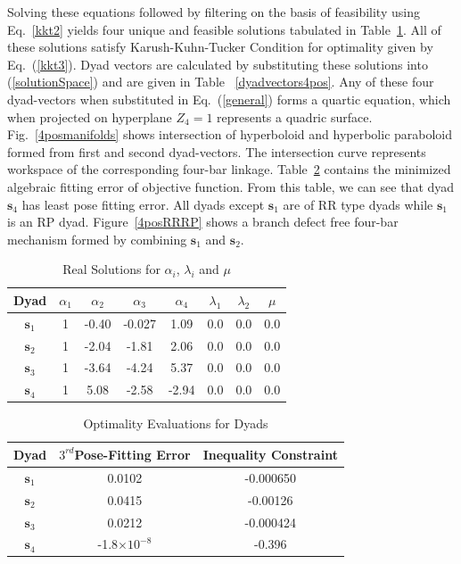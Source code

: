 \documentclass[twocolumn,10pt]{asme2ej}
\newcommand{\req}[1]{(\ref{#1})}
\begin{document}
Solving these equations followed by filtering on the basis of feasibility using Eq.~\ref{kkt2} yields four unique and feasible solutions tabulated in Table~\ref{alphasol}. All of these solutions satisfy Karush-Kuhn-Tucker Condition for optimality given by Eq.~\req{kkt3}. Dyad vectors are calculated by substituting these solutions into \req{solutionSpace} and are given in Table ~\ref{dyadvectors4pos}. Any of these four dyad-vectors when substituted in Eq.~\req{general} forms a quartic equation, which when projected on hyperplane $Z_4 = 1$ represents a quadric surface. Fig.~\ref{4posmanifolds} shows intersection of hyperboloid and hyperbolic paraboloid  formed from first and second dyad-vectors. The intersection curve represents workspace of the corresponding four-bar linkage. Table~\ref{error4pos} contains the minimized algebraic fitting error of objective function. From this table, we can see that dyad $\textbf{s}_4$ has least pose fitting error. All dyads except $\textbf{s}_1$ are of RR type dyads while $\textbf{s}_1$ is an RP dyad. Figure~\ref{4posRRRP} shows a branch defect free four-bar mechanism formed by combining $\textbf{s}_1$ and $\textbf{s}_2$.

\begin{table}
\caption{Real Solutions for $\alpha_i$, $\lambda_i$ and $\mu$}
\centering
\label{alphasol}
\begin{tabular}{cccccccc}
\hline
Dyad &$\alpha_1$&$\alpha_2$ & $\alpha_3$& $\alpha_4$& $\lambda_1$& $\lambda_2$& $\mu$\\
\hline
$\textbf{s}_1$  & 1 & -0.40 & -0.027 & 1.09 & 0.0 & 0.0 & 0.0 \\
$\textbf{s}_2$ & 1 &  -2.04 & -1.81 & 2.06 & 0.0 & 0.0 & 0.0 \\
$\textbf{s}_3$ & 1 &-3.64 & -4.24 & 5.37 & 0.0 & 0.0 & 0.0 \\
$\textbf{s}_4$ & 1 & 5.08 & -2.58 & -2.94  & 0.0 & 0.0 & 0.0 \\
\hline
\end{tabular}
\end{table}

\begin{table}
\caption{Optimality Evaluations for Dyads}
\centering
\label{error4pos}
\begin{tabular}{ccc}
\hline
Dyad & $3^{rd}$Pose-Fitting Error & Inequality Constraint \\
\hline
$\textbf{s}_1$ &  0.0102 & -0.000650 \\
$\textbf{s}_2$ &  0.0415 & -0.00126 \\
$\textbf{s}_3$ &  0.0212 & -0.000424 \\
$\textbf{s}_4$ & -1.8$\times10^{-8}$ &  -0.396 \\
\hline
\end{tabular}
\end{table}
\end{document}
